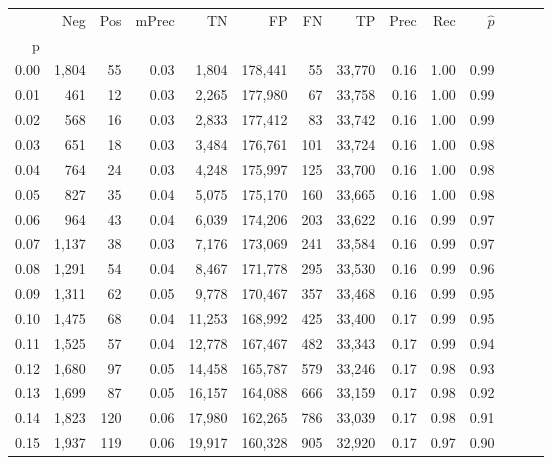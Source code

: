 \begin{tabular}{rrrrrrrrrrrrrr}
\toprule
{} &    Neg &  Pos & mPrec &       TN &       FP &      FN &      TP &  Prec &   Rec & $\hat{p}$ \\
p    &        &      &       &          &          &         &         &       &       &           \\
\midrule
0.00 &  1,804 &   55 &  0.03 &    1,804 &  178,441 &      55 &  33,770 &  0.16 &  1.00 &      0.99 \\
0.01 &    461 &   12 &  0.03 &    2,265 &  177,980 &      67 &  33,758 &  0.16 &  1.00 &      0.99 \\
0.02 &    568 &   16 &  0.03 &    2,833 &  177,412 &      83 &  33,742 &  0.16 &  1.00 &      0.99 \\
0.03 &    651 &   18 &  0.03 &    3,484 &  176,761 &     101 &  33,724 &  0.16 &  1.00 &      0.98 \\
0.04 &    764 &   24 &  0.03 &    4,248 &  175,997 &     125 &  33,700 &  0.16 &  1.00 &      0.98 \\
0.05 &    827 &   35 &  0.04 &    5,075 &  175,170 &     160 &  33,665 &  0.16 &  1.00 &      0.98 \\
0.06 &    964 &   43 &  0.04 &    6,039 &  174,206 &     203 &  33,622 &  0.16 &  0.99 &      0.97 \\
0.07 &  1,137 &   38 &  0.03 &    7,176 &  173,069 &     241 &  33,584 &  0.16 &  0.99 &      0.97 \\
0.08 &  1,291 &   54 &  0.04 &    8,467 &  171,778 &     295 &  33,530 &  0.16 &  0.99 &      0.96 \\
0.09 &  1,311 &   62 &  0.05 &    9,778 &  170,467 &     357 &  33,468 &  0.16 &  0.99 &      0.95 \\
0.10 &  1,475 &   68 &  0.04 &   11,253 &  168,992 &     425 &  33,400 &  0.17 &  0.99 &      0.95 \\
0.11 &  1,525 &   57 &  0.04 &   12,778 &  167,467 &     482 &  33,343 &  0.17 &  0.99 &      0.94 \\
0.12 &  1,680 &   97 &  0.05 &   14,458 &  165,787 &     579 &  33,246 &  0.17 &  0.98 &      0.93 \\
0.13 &  1,699 &   87 &  0.05 &   16,157 &  164,088 &     666 &  33,159 &  0.17 &  0.98 &      0.92 \\
0.14 &  1,823 &  120 &  0.06 &   17,980 &  162,265 &     786 &  33,039 &  0.17 &  0.98 &      0.91 \\
0.15 &  1,937 &  119 &  0.06 &   19,917 &  160,328 &     905 &  32,920 &  0.17 &  0.97 &      0.90 \\

\end{tabular}
